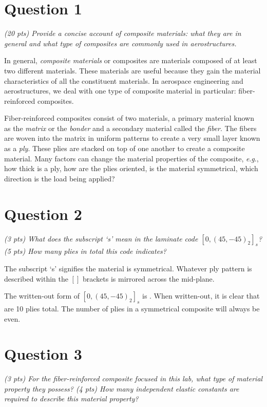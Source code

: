 \documentclass[12 pt]{article}
\newcommand{\eg}{\textit{e}.\textit{g}., }
\begin{document}
\section*{Question 1} \label{question_1}
\textit{(\num{20} pts) Provide a concise account of composite materials: what they are in general and what type of composites are commonly used in aerostructures.}

In general, \textit{composite materials} or composites are materials composed of at least two different materials. These materials are useful because they gain the material characteristics of all the constituent materials. In aerospace engineering and aerostructures, we deal with one type of composite material in particular: fiber-reinforced composites.

Fiber-reinforced composites consist of two materials, a primary material known as the \textit{matrix} or the \textit{bonder} and a secondary material called the \textit{fiber}. The fibers are woven into the matrix in uniform patterns to create a very small layer known as a \textit{ply}. These plies are stacked on top of one another to create a composite material. Many factors can change the material properties of the composite, \eg how thick is a ply, how are the plies oriented, is the material symmetrical, which direction is the load being applied?

\section*{Question 2} \label{question_2}
\textit{(\num{3} pts) What does the subscript `s' mean in the laminate code $[0,(45,-45)_2]_s$? (\num{5} pts) How many plies in total this code indicates?}

The subscript `s' signifies the material is symmetrical. Whatever ply pattern is described within the $[]$ brackets is mirrored across the mid-plane.

The written-out form of $[0,(45,-45)_2]_s$ is . When written-out, it is clear that are \num{10} plies total. The number of plies in a symmetrical composite will always be even.

\section*{Question 3} \label{question_3}
\textit{(\num{3} pts) For the fiber-reinforced composite focused in this lab, what type of material property they possess? (\num{4} pts) How many independent elastic constants are required to describe this material property?}
\end{document}
